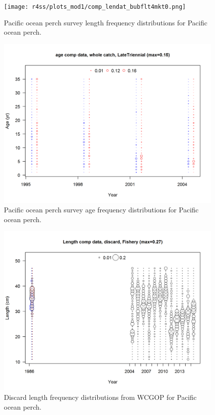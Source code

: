 \documentclass[12pt,]{article}
\begin{document}
\FloatBarrier

\begin{figure}
\centering
\texttt{[image: r4ss/plots\_mod1/comp\_lendat\_bubflt4mkt0.png]}
\caption{Pacific ocean perch survey length frequency distributions for
Pacific ocean perch. \label{fig:POP_Length}}
\end{figure}

\FloatBarrier

\begin{figure}
\centering
\includegraphics{r4ss/plots_mod1/comp_agedat_bubflt4mkt0.png}
\caption{Pacific ocean perch survey age frequency distributions for
Pacific ocean perch. \label{fig:POP_Age}}
\end{figure}

\FloatBarrier

\begin{figure}
\centering
\includegraphics{r4ss/plots_mod1/comp_lendat_bubflt1mkt1.png}
\caption{Discard length frequency distributions from WCGOP for Pacific
ocean perch. \label{fig:WCGOP_discard}}
\end{figure}
\end{document}
